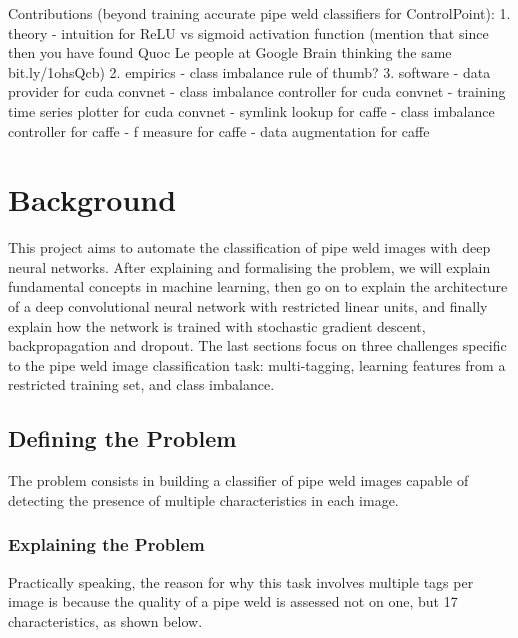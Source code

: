 \documentclass[a4paper,11pt]{article}
\begin{document}
Contributions (beyond training accurate pipe weld classifiers for ControlPoint):
1. theory
-  intuition for ReLU vs sigmoid activation function (mention that since then you have found Quoc Le people at Google Brain thinking the same bit.ly/1ohsQcb)	
2. empirics
- class imbalance rule of thumb?
3. software
- data provider for cuda convnet
- class imbalance controller for cuda convnet
- training time series plotter for cuda convnet
- symlink lookup for caffe
- class imbalance controller for caffe
- f measure for caffe
- data augmentation for caffe \\


\section{Background}

This project aims to automate the classification of pipe weld images with deep neural networks. After explaining and formalising the problem, we will explain fundamental concepts in machine learning, then go on to explain the architecture of a deep convolutional neural network with restricted linear units, and finally explain how the network is trained with stochastic gradient descent, backpropagation and dropout. The last sections focus on three challenges specific to the pipe weld image classification task: multi-tagging, learning features from a restricted training set, and class imbalance.

\subsection{Defining the Problem}

The problem consists in building a classifier of pipe weld images capable of detecting the presence of multiple characteristics in each image. 

\subsubsection{Explaining the Problem}

Practically speaking, the reason for why this task involves multiple tags per image is because the quality of a pipe weld is assessed not on one, but 17 characteristics, as shown below.
\end{document}
